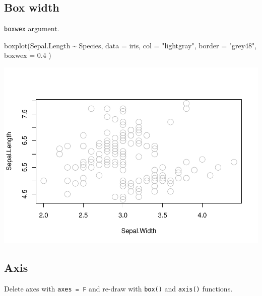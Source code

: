 \documentclass[
]{book}
\newenvironment{Shaded}{\begin{snugshade}}{\end{snugshade}}
\newcommand{\AttributeTok}[1]{\textcolor[rgb]{0.77,0.63,0.00}{#1}}
\newcommand{\FloatTok}[1]{\textcolor[rgb]{0.00,0.00,0.81}{#1}}
\newcommand{\FunctionTok}[1]{\textcolor[rgb]{0.00,0.00,0.00}{#1}}
\newcommand{\NormalTok}[1]{#1}
\newcommand{\SpecialCharTok}[1]{\textcolor[rgb]{0.00,0.00,0.00}{#1}}
\newcommand{\StringTok}[1]{\textcolor[rgb]{0.31,0.60,0.02}{#1}}
\begin{document}
\hypertarget{box-width}{%
\subsection{Box width}\label{box-width}}

\texttt{boxwex} argument.

\begin{Shaded}
\begin{Highlighting}[]
\FunctionTok{boxplot}\NormalTok{(Sepal.Length }\SpecialCharTok{\textasciitilde{}}\NormalTok{ Species, }\AttributeTok{data =}\NormalTok{ iris,}
        \AttributeTok{col =} \StringTok{"lightgray"}\NormalTok{, }\AttributeTok{border =} \StringTok{"grey48"}\NormalTok{,}
        \AttributeTok{boxwex =} \FloatTok{0.4}\NormalTok{ )}
\end{Highlighting}
\end{Shaded}

\begin{center}\includegraphics{biostats_files/figure-latex/unnamed-chunk-126-1} \end{center}

\hypertarget{axis-1}{%
\subsection{Axis}\label{axis-1}}

Delete axes with \texttt{axes\ =\ F} and re-draw with \texttt{box()} and \texttt{axis()} functions.
\end{document}
